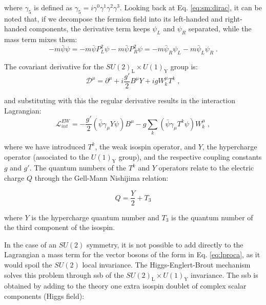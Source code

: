 \noindent where $\gamma_5$ is defined as $\gamma_5 = i \gamma^0 \gamma^1 \gamma^2 \gamma^3 $. Looking back at Eq. \ref{eq:sm:dirac}, it can be noted that, if we decompose the fermion field into its left-handed and right-handed components, the derivative term keeps $\psi_L$ and $\psi_R$ separated, while the mass term mixes them:
\begin{equation}
-m \bar \psi \psi = -m \bar \psi P_L^2 \psi - m \bar \psi P_R^2 \psi
	= -m \bar \psi_R \psi_L - m \bar \psi_L \psi_R \; .
\end{equation}


\noindent The covariant derivative for the  $SU(2)_\mathrm{L} \times U(1)_\mathrm{Y}$ group is:
\begin{equation}
\mathcal{D}^{\mu} = \partial^{\mu} + i \frac{g'}{2} B^\mu Y + ig W^\mu_k T^k \; ,
\label{eq:sm:covD}
\end{equation}

\noindent and substituting with this the regular derivative results in the interaction Lagrangian:
\begin{equation}
\mathcal{L}_{int}^{EW} = -\frac{g'}{2} \left( \bar{\psi} \gamma_\mu Y \psi \right) B^\mu - g \sum_k \left( \bar{\psi} \gamma_\mu T^k \psi  \right) W_k^\mu \; ,
\end{equation}

\noindent where we have introduced $T^k$, the weak isospin operator, and $Y$, the hypercharge operator (associated to the $U(1)_\mathrm{Y}$ group), and the respective coupling constants $g$ and $g'$. The quantum numbers of the $T^k$ and $Y$ operators relate to the electric charge $Q$ through the  Gell-Mann Nishijima relation:

\begin{equation}
Q = \frac{Y}{2} + T_3
\label{eq:sm:Q}
\end{equation}

\noindent where $Y$ is the hypercharge quantum number and $T_3$ is the quantum number of the third component of the isospin. 

In the case of an $SU(2)$ symmetry, it is not possible to add directly to the Lagrangian a mass term for the vector bosons of the form in Eq. \ref{eq:lproca}, as it would spoil the $SU(2)$ local invariance. The Higgs-Englert-Brout mechanism \cite{Englert:1964et, Higgs:1964pj, Higgs:1964ia} solves this problem through \gls{ssb} of the $SU(2)_\mathrm{L} \times U(1)_\mathrm{Y}$ invariance. The \gls{ssb} is obtained by adding to the theory one extra isospin doublet of complex scalar components (Higgs field):

